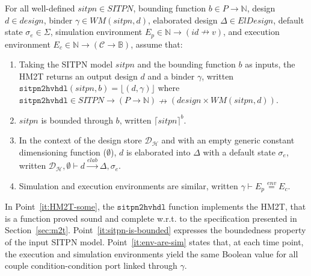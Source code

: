\begin{definition}[HM2T hypotheses]
  \label{def:hm2t-hyps}
  For all well-defined $sitpn\in{}SITPN$, bounding function
  $b\in{}P\rightarrow\mathbb{N}$, \hvhdl{} design $d\in{}design$,
  binder $\gamma\in{}WM(sitpn,d)$, elaborated design
  $\Delta\in{}ElDesign$, default state $\sigma_e\in\Sigma$, simulation
  environment $E_p\in\mathbb{N}\rightarrow{}(id\nrightarrow{}v)$, and
  execution environment
  $E_c\in\mathbb{N}\rightarrow(\mathcal{C}\rightarrow\mathbb{B})$,
  assume that:
  \begin{enumerate}
  \item\label{it:HM2T-some} Taking the SITPN model $sitpn$ and the
    bounding function $b$ as inputs, the HM2T returns an output design
    $d$ and a binder $\gamma$, written
    $\mathtt{sitpn2hvhdl}(sitpn, b)=\lfloor(d,\gamma)\rfloor$ where
    $\mathtt{sitpn2hvhdl}\in{}SITPN\rightarrow(P\rightarrow\mathbb{N})\nrightarrow(design\times{}WM(sitpn,d))$.
  \item\label{it:sitpn-is-bounded} $sitpn$ is bounded through $b$,
    written $\lceil{}sitpn\rceil^b$.
  \item In the context of the \hilecop{} design store
    $\mathcal{D}_\mathcal{H}$ and with an empty generic constant
    dimensioning function ($\emptyset$), $d$ is elaborated into
    $\Delta$ with a default state $\sigma_e$, written
    $\mathcal{D}_\mathcal{H},\emptyset\vdash{}d\xrightarrow{elab}\Delta,\sigma_e$.
  \item\label{it:env-are-sim} Simulation and execution environments
    are similar, written $\gamma\vdash{}E_p\stackrel{env}{=}E_c$.
  \end{enumerate}
  
\end{definition}

In Point~\ref{it:HM2T-some}, the $\mathtt{sitpn2hvhdl}$ function
implements the HM2T, that is a function proved sound and complete
w.r.t. to the specification presented in
Section~\ref{sec:m2t}. Point~\ref{it:sitpn-is-bounded} expresses the
boundedness property of the input SITPN
model. Point~\ref{it:env-are-sim} states that, at each time point, the
execution and simulation environments yield the same Boolean value for
all couple condition-condition port linked through $\gamma$.

\def\hm2thyps{well-defined $sitpn\in{}SITPN$,
  $b\in{}P\rightarrow\mathbb{N}$, $d\in{}design$,
  $\gamma\in{}WM(sitpn,d)$, $\Delta\in{}ElDesign,\sigma_{e}\in\Sigma$,
  $E_p\in\mathbb{N}\rightarrow{}(id\nrightarrow{}v)$, and
  $E_c\in\mathbb{N}\rightarrow(\mathcal{C}\rightarrow\mathbb{B})$ that
  verify the hypotheses of Definition~\ref{def:hm2t-hyps}}

